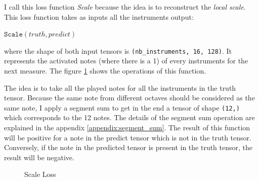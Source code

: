 \documentclass[12pt]{report}
\begin{document}
I call this loss function \textit{Scale} because the idea is to reconstruct the \textit{local scale}.
This loss function takes as inputs all the instruments output:
\begin{center}
$\texttt{Scale}(truth, predict)$
\end{center}
where the shape of both input tensors is \texttt{(nb\_instruments, 16, 128)}.
It represents the activated notes (where there is a 1) of every instruments for the next measure.
The figure \ref{fig:loss_scale} shows the operations of this function.

The idea is to take all the played notes for all the instruments in the truth tensor.
Because the same note from different octaves should be considered as the same note, I apply a segment sum to get in the end a tensor of shape \texttt{(12,)} which corresponds to the 12 notes.
The details of the segment sum operation are explained in the appendix \ref{appendix:segment_sum}.
The result of this function will be positive for a note in the predict tensor which is not in the truth tensor.
Conversely, if the note in the predicted tensor is present in the truth tensor, the result will be negative.


\begin{figure}[h]
\begin{center}
\end{center}
\caption{Scale Loss}
\label{fig:loss_scale}
\end{figure}
\end{document}
